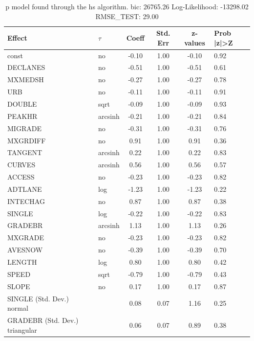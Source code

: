 \begin{table}
	\caption{p model found through the hs algorithm. bic: 26765.26 Log-Likelihood: -13298.02 RMSE_TEST: 29.00}
	\begin{center}
		\begin{tabular}{|l|l|c|c|c|l|}
			\hline
			Effect & $\tau$ & Coeff & Std. Err & z-values & Prob |z|>Z \\
			\hline
			const & no & -0.10 & 1.00 & -0.10 & 0.92 \\
			\hline
			DECLANES & no & -0.51 & 1.00 & -0.51 & 0.61 \\
			\hline
			MXMEDSH & no & -0.27 & 1.00 & -0.27 & 0.78 \\
			\hline
			URB & no & -0.11 & 1.00 & -0.11 & 0.91 \\
			\hline
			DOUBLE & sqrt & -0.09 & 1.00 & -0.09 & 0.93 \\
			\hline
			PEAKHR & arcsinh & -0.21 & 1.00 & -0.21 & 0.84 \\
			\hline
			MIGRADE & no & -0.31 & 1.00 & -0.31 & 0.76 \\
			\hline
			MXGRDIFF & no & 0.91 & 1.00 & 0.91 & 0.36 \\
			\hline
			TANGENT & arcsinh & 0.22 & 1.00 & 0.22 & 0.83 \\
			\hline
			CURVES & arcsinh & 0.56 & 1.00 & 0.56 & 0.57 \\
			\hline
			ACCESS & no & -0.23 & 1.00 & -0.23 & 0.82 \\
			\hline
			ADTLANE & log & -1.23 & 1.00 & -1.23 & 0.22 \\
			\hline
			INTECHAG & no & 0.87 & 1.00 & 0.87 & 0.38 \\
			\hline
			SINGLE & log & -0.22 & 1.00 & -0.22 & 0.83 \\
			\hline
			GRADEBR & arcsinh & 1.13 & 1.00 & 1.13 & 0.26 \\
			\hline
			MXGRADE & no & -0.23 & 1.00 & -0.23 & 0.82 \\
			\hline
			AVESNOW & no & -0.39 & 1.00 & -0.39 & 0.70 \\
			\hline
			LENGTH & log & 0.80 & 1.00 & 0.80 & 0.42 \\
			\hline
			SPEED & sqrt & -0.79 & 1.00 & -0.79 & 0.43 \\
			\hline
			SLOPE & no & 0.17 & 1.00 & 0.17 & 0.87 \\
			\hline
			SINGLE (Std. Dev.) normal &  & 0.08 & 0.07 & 1.16 & 0.25 \\
			\hline
			GRADEBR (Std. Dev.) triangular &  & 0.06 & 0.07 & 0.89 & 0.38 \\

\end{tabular}
\end{center}
\end{table}
